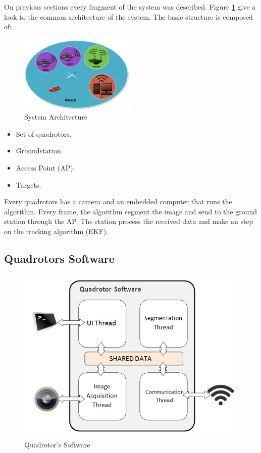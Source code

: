 On previous sections every fragment of the system was described. Figure \ref{fig:System_Architecture} give a look to the common architecture of the system. The basic structure is composed of:
\begin{figure}[h]
	\centering
	\includegraphics[width=0.50\textwidth,natwidth=220,natheight=1467]{../Images/c2/Architecture.png}
	\caption{System Architecture}
	\label{fig:System_Architecture}
\end{figure}


\begin{itemize}
  \item Set of quadrotors.
  \item Groundstation.
  \item Access Point (AP).
  \item Targets.
\end{itemize}

Every quadrotors has a camera and an embedded computer that runs the algorithm. Every frame, the algorithm segment the image and send to the ground station through the AP. The station process the received data and make an step on the tracking algorithm (EKF).

\subsection{Quadrotors Software}

	\begin{figure}
		\begin{center}
			\includegraphics[width=\linewidth]{../Images/c2/Quadsoftware}
		\end{center}
		\caption{Quadrotor's Software}
		\label{fig:Quadsoftware}
	\end{figure}

